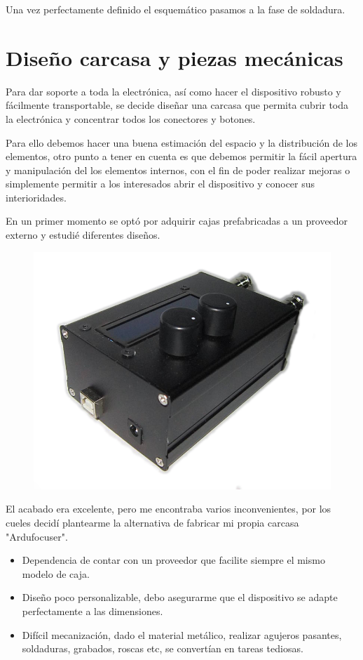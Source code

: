Una vez perfectamente definido el esquemático pasamos a la fase de soldadura.

\newpage


\section{Diseño carcasa y piezas mecánicas}

Para dar soporte a toda la electrónica, así como hacer el dispositivo robusto y fácilmente transportable,
se decide diseñar una carcasa que permita cubrir toda la electrónica y concentrar todos los conectores y botones. 

Para ello debemos hacer una buena estimación del espacio y la distribución de los elementos, otro punto a tener en cuenta es que debemos permitir la fácil apertura y manipulación del los elementos internos, con el fin de poder realizar mejoras o simplemente permitir a los interesados abrir el dispositivo y conocer sus interioridades. 

En un primer momento se optó por adquirir cajas prefabricadas a un proveedor externo y estudié diferentes diseños.

\begin{figure}
\centering
\includegraphics[width=0.7\linewidth]{../images/ardufocuser}
\caption{}
\label{fig:ardufocuser}
\end{figure}


El acabado era excelente, pero me encontraba varios inconvenientes, por los cueles decidí plantearme la alternativa de fabricar mi propia carcasa "Ardufocuser". 

\begin{itemize}
	\item Dependencia de contar con un proveedor que facilite siempre el mismo modelo de caja.
	\item Diseño poco personalizable, debo asegurarme que el dispositivo se adapte perfectamente a las dimensiones.
	\item  Difícil mecanización, dado el material metálico, realizar agujeros pasantes, soldaduras, grabados, roscas etc, se convertían en tareas tediosas. 
\end{itemize}

